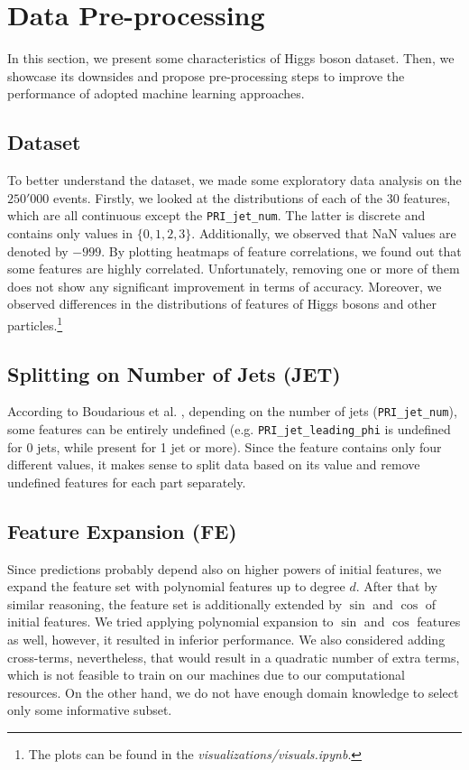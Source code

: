 \section{Data Pre-processing}
\label{preprocessing}

In this section, we present some characteristics of Higgs boson dataset. Then, we showcase its downsides and propose pre-processing steps to improve the performance of adopted machine learning approaches.

\subsection{Dataset}

To better understand the dataset, we made some exploratory data analysis on the $250'000$ events. Firstly, we looked at the distributions of each of the $30$ features, which are all continuous except the \texttt{PRI\_jet\_num}. The latter is discrete and contains only values in $\{0, 1, 2, 3\}$. Additionally, we observed that NaN values are denoted by $-999$. By plotting heatmaps of feature correlations, we found out that some features are highly correlated. Unfortunately, removing one or more of them does not show any significant improvement in terms of accuracy. Moreover, we observed differences in the distributions of features of Higgs bosons and other particles.\footnote{The plots can be found in the \textit{visualizations/visuals.ipynb}.}



\subsection{Splitting on Number of Jets (JET)}

According to Boudarious et al. \cite{bourdarious2014}, depending on the number of jets (\texttt{PRI\_jet\_num}), some features can be entirely undefined (e.g. \texttt{PRI\_jet\_leading\_phi} is undefined for 0 jets, while present for 1 jet or more). Since the feature contains only four different values, it makes sense to split data based on its value and remove undefined features for each part separately. 



\subsection{Feature Expansion (FE)}

Since predictions probably depend also on higher powers of initial features, we expand the feature set with polynomial features up to degree $d$. After that by similar reasoning, the feature set is additionally extended by $\sin$ and $\cos$ of initial features. We tried applying polynomial expansion to $\sin$ and $\cos$ features as well, however, it resulted in inferior performance. We also considered adding cross-terms, nevertheless, that would result in a quadratic number of extra terms, which is not feasible to train on our machines due to our computational resources. On the other hand, we do not have enough domain knowledge to select only some informative subset.


